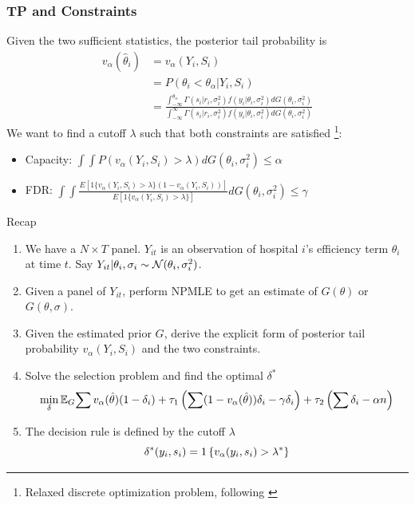 \documentclass[10pt,mathserif,aspectratio=169]{beamer}
\begin{document}
\begin{frame}
  \frametitle{TP and Constraints}
  Given the two sufficient statistics, the posterior tail probability is
  \begin{align*}
    v_\alpha(\hat{\theta}_i) & =v_\alpha(Y_i,S_i)                                                                                                         \\
                             & = P( \theta_i < \theta_{\alpha} | Y_i,S_i)                                                                                 \\
                             & = \frac{{\int_{-\infty}^{\theta_{\alpha}} \Gamma(s_i|r_i,\sigma_i^2) f(y_i|\theta_i, \sigma_i^2) dG(\theta_i,\sigma_i^2)}}
    {{\int_{-\infty}^{\infty} \Gamma(s_i|r_i,\sigma_i^2) f(y_i|\theta_i, \sigma_i^2) dG(\theta_i,\sigma_i^2)}}
  \end{align*}
  We want to find a cutoff $\lambda$ such that both constraints are satisfied \footnote{Relaxed discrete optimization problem, following \citep{basu2018weighted}}:\\
  \begin{itemize}\itemsep=8pt
    \item Capacity: $\int \int P(v_\alpha(Y_i, S_i) > \lambda) dG(\theta_i,\sigma_i^2)
            \leq \alpha$
    \item FDR: $\int \int
            \frac{E[1\{v_\alpha(Y_i,S_i)>\lambda\}(1-v_\alpha(Y_i,S_i))]}{E[1\{v_\alpha(Y_i,S_i)>\lambda\}]}
            dG(\theta_i,\sigma_i^2) \leq \gamma$
  \end{itemize}
\end{frame}

\begin{frame}{Recap}

  \begin{enumerate}
    \item We have a $N\times T$ panel. $Y_{it}$ is an observation of hospital $i$'s
          efficiency term $\theta_i$ at time $t$. Say $Y_{it}|\theta_i,\sigma_i \sim
            \mathcal{N}(\theta_i,\sigma_i^2)$.
    \item Given a panel of $Y_{it}$, perform NPMLE to get an estimate of $G(\theta)$ or
          $G(\theta,\sigma)$.
    \item Given the estimated prior $G$, derive the explicit form of posterior tail
          probability $v_\alpha(Y_i,S_i)$ and the two constraints.
    \item Solve the selection problem and find the optimal $\delta^*$
          \begin{equation*}
            \min_{\delta}\mathbb{E}_G{\sum v_\alpha(\hat{\theta})(1-\delta_i) +\tau_1\left(\sum (1-v_\alpha(\hat{\theta}))\delta_i -\gamma \delta_i\right) + \tau_2 \left(\sum \delta_i -\alpha n\right)}
          \end{equation*}
    \item The decision rule is defined by the cutoff $\lambda$
          \[\delta^*(y_i,s_i)=1\left\{v_\alpha(y_i,s_i)>\lambda^*\right\}\]
  \end{enumerate}
\end{frame}
\end{document}
